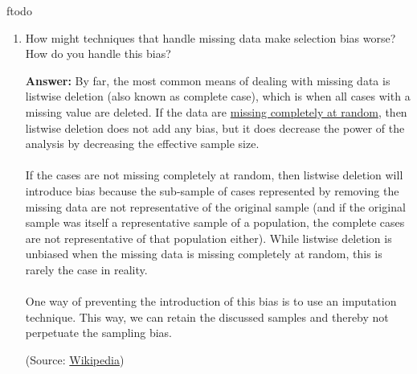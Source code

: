 ƒtodo\documentclass{article}
\newenvironment{QandA}{\begin{enumerate}[label=\arabic*.]}{\end{enumerate}}
\newenvironment{InnerQandA}{\begin{enumerate}[label=\roman*.]}{\end{enumerate}}
\newenvironment{answer}{\par\normalfont \textbf{Answer:}}{}
\begin{document}
\begin{QandA}
\begin{InnerQandA}
        \item How might techniques that handle missing data make selection bias worse? How do you handle this bias?
        \begin{answer}
            By far, the most common means of dealing with missing data is listwise deletion (also known as complete case), which is when all cases with a missing value are deleted. If the data are \href{https://en.wikipedia.org/wiki/Missing_data#Missing_completely_at_random}{missing completely at random}, then listwise deletion does not add any bias, but it does decrease the power of the analysis by decreasing the effective sample size. \\\\
            If the cases are not missing completely at random, then listwise deletion will introduce bias because the sub-sample of cases represented by removing the missing data are not representative of the original sample (and if the original sample was itself a representative sample of a population, the complete cases are not representative of that population either). While listwise deletion is unbiased when the missing data is missing completely at random, this is rarely the case in reality.\\\\
            One way of preventing the introduction of this bias is to use an imputation technique. This way, we can retain the discussed samples and thereby not perpetuate the sampling bias.

            (Source: \href{https://en.wikipedia.org/wiki/Imputation_(statistics)}{Wikipedia})
        \end{answer}
    \end{InnerQandA}


\end{QandA}
\end{document}
